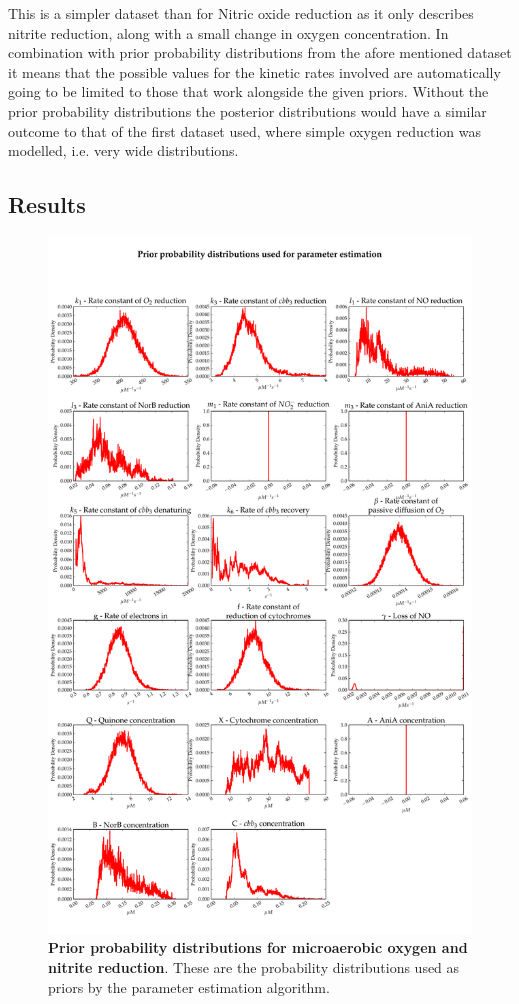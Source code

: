 This is a simpler dataset than for Nitric oxide reduction as it only describes nitrite reduction, along with a small change in oxygen concentration. In combination with prior probability distributions from the afore mentioned dataset it means that the possible values for the kinetic rates involved are automatically going to be limited to those that work alongside the given priors. Without the prior probability distributions the posterior distributions would have a similar outcome to that of the first dataset used, where simple oxygen reduction was modelled, i.e. very wide distributions.
\subsection{Results}
\begin{figure}[tbp]
 \centering
 \includegraphics[width=15cm, trim=0cm 0cm 0cm 0cm]{./07-nitritereduction/data/priors1.pdf}
 \caption[Prior probability distributions for microaerobic oxygen and nitrite reduction]{{\bf Prior probability distributions for microaerobic oxygen and nitrite reduction}. These are the probability distributions used as priors by the parameter estimation algorithm.
 \label{fig:nitrite_priors1}}
\end{figure}
\afterpage{\clearpage}

